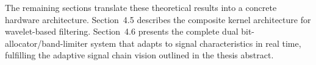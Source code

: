 The remaining sections translate these theoretical results into a concrete hardware architecture. Section~4.5 describes the composite kernel architecture for wavelet-based filtering. Section~4.6 presents the complete dual bit-allocator/band-limiter system that adapts to signal characteristics in real time, fulfilling the adaptive signal chain vision outlined in the thesis abstract.

